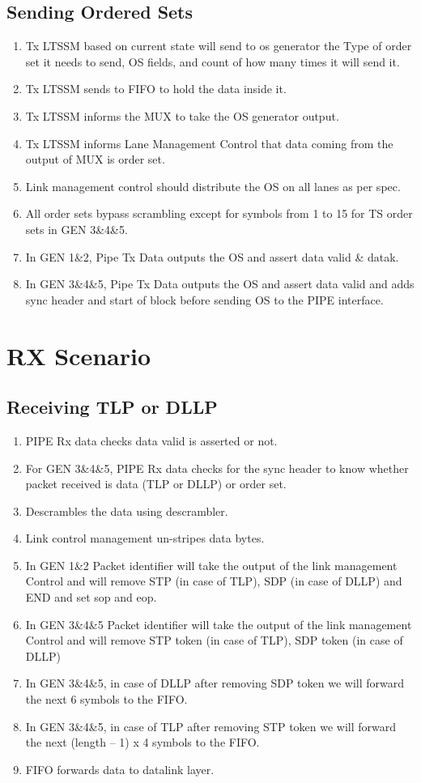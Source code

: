 \subsection{Sending Ordered Sets}
\begin{enumerate}
  \item Tx LTSSM based on current state will send to os generator the Type of order set it needs to send, OS fields, and count of how many times it will send it.
  \item Tx LTSSM sends to FIFO to hold the data inside it.
  \item Tx LTSSM informs the MUX to take the OS generator output.
  \item Tx LTSSM informs Lane Management Control that data coming from the output of MUX is order set.
  \item Link management control should distribute the OS on all lanes as per spec.
  \item All order sets bypass scrambling except for symbols from 1 to 15 for TS order sets in GEN 3\&4\&5.
  \item In GEN 1\&2, Pipe Tx Data outputs the OS and assert data valid \& datak. 
  \item In GEN 3\&4\&5, Pipe Tx Data outputs the OS and assert data valid and adds sync header and start of block before sending OS to the PIPE interface. 
\end{enumerate}

\section{RX Scenario}
\subsection{Receiving TLP or DLLP}
\begin{enumerate}
  \item PIPE Rx data checks data valid is asserted or not.
  \item For GEN 3\&4\&5, PIPE Rx data checks for the sync header to know whether packet received is data (TLP or DLLP) or order set.
  \item Descrambles the data using descrambler.
  \item Link control management un-stripes data bytes.
  \item In GEN 1\&2 Packet identifier will take the output of the link management Control and will remove STP (in case of TLP), SDP (in case of DLLP) and END and set sop and eop.
  \item In GEN 3\&4\&5 Packet identifier will take the output of the link management Control and will remove STP token (in case of TLP), SDP token (in case of DLLP) 
  \item In GEN 3\&4\&5, in case of DLLP after removing SDP token we will forward the next 6 symbols to the FIFO.
  \item In GEN 3\&4\&5, in case of TLP after removing STP token we will forward the next (length – 1) x 4 symbols to the FIFO.
  \item FIFO forwards data to datalink layer.
\end{enumerate}
